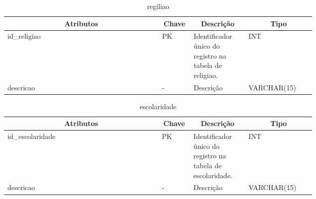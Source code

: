 \begin{enumerate}
    \begin{table}[H]
    \caption{regiliao}
    \label{regiliao}
    	\centering\footnotesize
        \begin{tabular}{|p{0.40\linewidth} | p{0.04\linewidth} |  p{0.12\linewidth} | p{0.16\linewidth} |}  \hline
        \multicolumn{1}{|c|}{\textbf{Atributos}} &
        \multicolumn{1}{|c|}{\textbf{Chave}} &
        \multicolumn{1}{c|}{\textbf{Descrição}} &
        \multicolumn{1}{c|}{\textbf{Tipo}} \\ \hline
          
        id\_religiao  &  
        PK & 
        Identificador único do registro na tabela de religiao. &
        INT
        \\  \hline
        
        descricao & 
        - & 
        Descrição &
        VARCHAR(15)
        \\ \hline
       
        \end{tabular}
    \end{table}
\end{enumerate}

\begin{enumerate}
    \begin{table}[H]
    \caption{escolaridade}
    \label{escolaridade}
    	\centering\footnotesize
        \begin{tabular}{|p{0.40\linewidth} | p{0.04\linewidth} |  p{0.12\linewidth} | p{0.16\linewidth} |}  \hline
        \multicolumn{1}{|c|}{\textbf{Atributos}} &
        \multicolumn{1}{|c|}{\textbf{Chave}} &
        \multicolumn{1}{c|}{\textbf{Descrição}} &
        \multicolumn{1}{c|}{\textbf{Tipo}} \\ \hline
          
        id\_escolaridade  &  
        PK & 
        Identificador único do registro na tabela de escolaridade. &
        INT
        \\  \hline
        
        descricao & 
        - & 
        Descrição &
        VARCHAR(15)
        \\ \hline
       
        \end{tabular}
    \end{table}
\end{enumerate}

